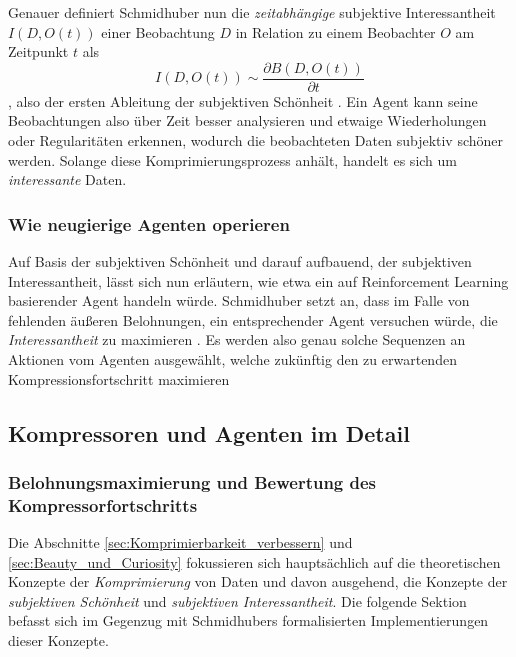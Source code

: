 Genauer definiert Schmidhuber nun die \emph{zeitabhängige} subjektive Interessantheit \(I(D,O(t))\) einer Beobachtung \(D\) in Relation zu einem Beobachter \(O\) am Zeitpunkt \(t\) als 
\begin{equation}
    I(D,O(t)) \sim \frac{\partial B(D,O(t))}{\partial t}
\end{equation}
, also der ersten Ableitung der subjektiven Schönheit \cite[p.~8]{curiosity_schmidhuber}.
Ein Agent kann seine Beobachtungen also über Zeit besser analysieren und etwaige Wiederholungen oder Regularitäten erkennen, wodurch die beobachteten Daten subjektiv schöner werden. Solange diese Komprimierungsprozess anhält, handelt es sich um \emph{interessante} Daten. \cite[p.~8]{curiosity_schmidhuber}

\subsubsection{Wie neugierige Agenten operieren}
Auf Basis der subjektiven Schönheit und darauf aufbauend, der subjektiven Interessantheit, lässt sich nun erläutern, wie etwa ein auf Reinforcement Learning basierender Agent handeln würde. 
Schmidhuber setzt an, dass im Falle von fehlenden äußeren Belohnungen, ein entsprechender Agent versuchen würde, die \emph{Interessantheit} zu maximieren \cite[p.~8]{curiosity_schmidhuber}.
Es werden also genau solche Sequenzen an Aktionen vom Agenten ausgewählt, welche zukünftig den zu erwartenden Kompressionsfortschritt maximieren \cite[p.~8]{curiosity_schmidhuber}

\subsection{Kompressoren und Agenten im Detail}

\subsubsection{Belohnungsmaximierung und Bewertung des Kompressorfortschritts}
Die Abschnitte \ref{sec:Komprimierbarkeit_verbessern} und \ref{sec:Beauty_und_Curiosity} fokussieren sich hauptsächlich auf die theoretischen Konzepte der \emph{Komprimierung} von Daten und davon ausgehend, die Konzepte der \emph{subjektiven Schönheit} und \emph{subjektiven Interessantheit}.
Die folgende Sektion befasst sich im Gegenzug mit Schmidhubers formalisierten Implementierungen dieser Konzepte.

